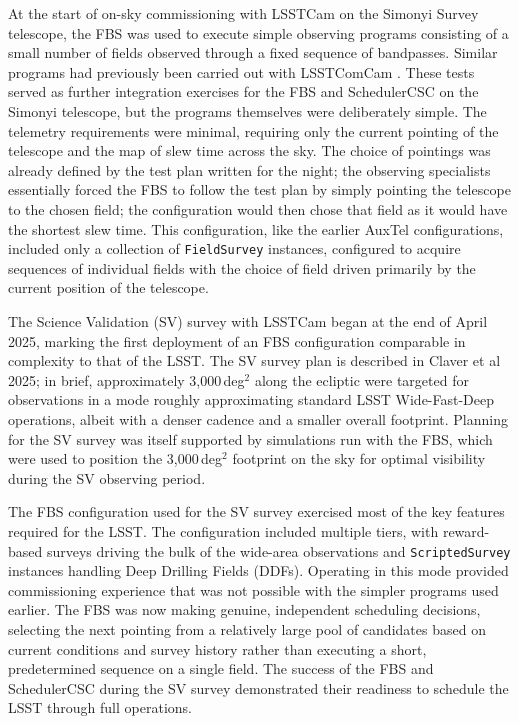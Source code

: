 At the start of on-sky commissioning with LSSTCam\cite{2024SPIE13096E..1OL, 2024SPIE13096E..1SR}  on the Simonyi Survey telescope, the
FBS was used to execute simple observing programs consisting of a small number of
fields observed through a fixed sequence of bandpasses. Similar programs had
previously been carried out with LSSTComCam \cite{SITCOMTN-149, 2022SPIE12184E..0JS}. 
These tests served as further
integration exercises for the FBS and SchedulerCSC on the Simonyi telescope, but
the programs themselves were deliberately simple. The telemetry requirements were
minimal, requiring only the current pointing of the telescope and the map of slew time
across the sky. The choice of pointings was already defined by the test plan
written for the night; the observing specialists essentially forced the FBS to follow the test plan
by simply pointing the telescope to the chosen field; the configuration would then chose that 
field as it would have the shortest slew time.  
This configuration, like the earlier AuxTel configurations,
included only a collection of \texttt{FieldSurvey} instances, configured to acquire sequences
of individual fields with the choice of field driven primarily by the current position of the telescope.

The Science Validation (SV) survey with LSSTCam began at the end of April
2025, marking the first deployment of an FBS configuration comparable in
complexity to that of the LSST. The SV survey plan is described in Claver et al 2025\cite{SITCOMTN-005}; 
in brief, approximately 3{,}000\,deg$^{2}$ along the
ecliptic were targeted for observations in a mode roughly approximating standard
LSST Wide-Fast-Deep operations, albeit with a denser cadence and a smaller
overall footprint. Planning for the SV survey was itself supported by simulations
run with the FBS, which were used to position the 3{,}000\,deg$^{2}$ footprint
on the sky for optimal visibility during the SV observing period. 

The FBS configuration used for the SV survey exercised most of the key features
required for the LSST. The configuration included multiple tiers,
with reward-based surveys driving the bulk of the wide-area observations and
\texttt{ScriptedSurvey} instances handling Deep Drilling Fields (DDFs).
Operating in this mode provided commissioning experience that was not possible
with the simpler programs used earlier. The FBS was now making genuine, independent
scheduling decisions, selecting the next pointing from a relatively large pool of
candidates based on current conditions and survey history rather than
executing a short, predetermined sequence on a single field. The success of the 
FBS and SchedulerCSC during the SV survey demonstrated their readiness
to schedule the LSST through full operations.


